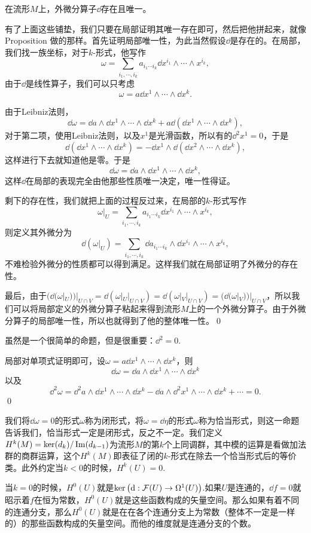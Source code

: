 \pro 在流形$M$上，外微分算子$\dd$存在且唯一。

\proof 有了上面这些铺垫，我们只要在局部证明其唯一存在即可，然后把他拼起来，就像Proposition 做的那样。首先证明局部唯一性，为此当然假设$\dd$是存在的。在局部，我们找一族坐标，对于$k$-形式，他写作
\[
	\omega=\sum_{i_1,\cdots ,i_k} a_{i_1\cdots i_k}\dd x^{i_{1}}\wedge\cdots\wedge x^{i_{k}},
\]
由于$\dd$是线性算子，我们可以只考虑
\[
	\omega=a\dd x^{1}\wedge\cdots\wedge \dd x^{k}.
\]

由于Leibniz法则，
\[
	\dd \omega=\dd a \wedge \dd x^{1}\wedge\cdots\wedge \dd x^{k}+a\dd(\dd x^{1}\wedge\cdots\wedge \dd x^{k}),
\]
对于第二项，使用Leibniz法则，以及$x^1$是光滑函数，所以有的$\dd^2 x^1=0$，于是
\[
	\dd(\dd x^{1}\wedge\cdots\wedge \dd x^{k})=-\dd x^{1}\wedge\dd(\dd x^{2}\wedge\cdots\wedge \dd x^{k}),
\]
这样进行下去就知道他是零。于是
\[
	\dd \omega=\dd a \wedge \dd x^{1}\wedge\cdots\wedge \dd x^{k},
\]
这样$\dd$在局部的表现完全由他那些性质唯一决定，唯一性得证。

剩下的存在性，我们就把上面的过程反过来，在局部的$k$-形式写作
\[
	\omega|_U=\sum_{i_1,\cdots ,i_k} a_{i_1\cdots i_k}\dd x^{i_{1}}\wedge\cdots\wedge x^{i_{k}},
\]
则定义其外微分为
\[
	\dd(\omega|_U)=\sum_{i_1,\cdots ,i_k} \dd a_{i_1\cdots i_k}\wedge\dd x^{i_{1}}\wedge\cdots\wedge x^{i_{k}},
\]
不难检验外微分的性质都可以得到满足。这样我们就在局部证明了外微分的存在性。

最后，由于$(\dd(\omega|_U))|_{U\cap V}=\dd(\omega|_U|_{U\cap V})=\dd(\omega|_V|_{U\cap V})=(\dd(\omega|_V))|_{U\cap V}$，所以我们可以将局部定义的外微分算子粘起来得到流形$M$上的一个外微分算子。由于外微分算子的局部唯一性，所以也就得到了他的整体唯一性。\qed

\pro 虽然是一个很简单的命题，但是很重要：$\dd^2=0$.

\proof 局部对单项式证明即可，设$\omega=a\dd x^{1}\wedge\cdots\wedge \dd x^{k}$，则
\[
	\dd \omega=\dd a\wedge \dd x^{1}\wedge\cdots\wedge \dd x^{k}
\]
以及
\[
	\dd^2 \omega=\dd^2 a\wedge \dd x^{1}\wedge\cdots\wedge \dd x^{k}-\dd a\wedge \dd^2 x^{1}\wedge\cdots\wedge \dd x^{k}+\cdots=0.
\]
\qed

\para 我们将$\dd \omega=0$的形式$\omega$称为闭形式，将$\omega=\dd \eta$的形式$\omega$称为恰当形式，则这一命题告诉我们，恰当形式一定是闭形式，反之不一定。我们定义$H^k(M)=\ker(d_k)/\operatorname{Im}(d_{k-1})$为流形$M$的第$k$个上同调群，其中模的运算是看做加法群的商群运算，这个$H^k(M)$即表征了闭的$k$-形式在除去一个恰当形式后的等价类。此外约定当$k<0$的时候，$H^k(U)=0$.

当$k=0$的时候，$H^0(U)$就是$\mathrm{ker}\left(\mathrm{d}:\mathcal{F}(U)\to\Omega^1(U)\right)$.如果$U$是连通的，$\dd f=0$就昭示着$f$在恒为常数，$H^0(U)$就是这些函数构成的矢量空间。那么如果有着不同的连通分支，那么$H^0(U)$就是在在各个连通分支上为常数（整体不一定是一样的）的那些函数构成的矢量空间。而他的维度就是连通分支的个数。

